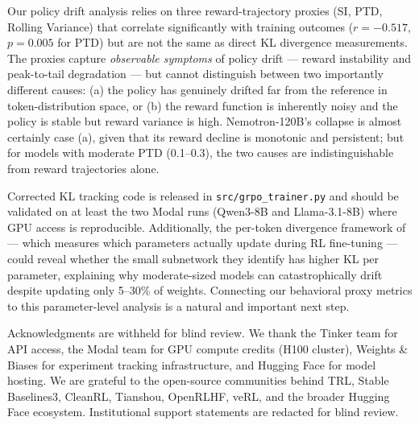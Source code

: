 \documentclass{article}
\begin{document}
Our policy drift analysis relies on three reward-trajectory proxies (SI, PTD,
Rolling Variance) that correlate significantly with training outcomes
($r = -0.517$, $p = 0.005$ for PTD) but are not the same as direct KL
divergence measurements.
The proxies capture \emph{observable symptoms} of policy drift --- reward
instability and peak-to-tail degradation --- but cannot distinguish between
two importantly different causes: (a) the policy has genuinely drifted far from
the reference in token-distribution space, or (b) the reward function is
inherently noisy and the policy is stable but reward variance is high.
Nemotron-120B's collapse is almost certainly case (a), given that its reward
decline is monotonic and persistent; but for models with moderate PTD (0.1--0.3),
the two causes are indistinguishable from reward trajectories alone.

Corrected KL tracking code is released in \texttt{src/grpo\_trainer.py} and
should be validated on at least the two Modal runs (Qwen3-8B and
Llama-3.1-8B) where GPU access is reproducible.
Additionally, the per-token divergence framework of \citet{liu2025rlsubnetworks}
--- which measures which parameters actually update during RL fine-tuning ---
could reveal whether the small subnetwork they identify has higher KL per
parameter, explaining why moderate-sized models can catastrophically drift
despite updating only 5--30\% of weights.
Connecting our behavioral proxy metrics to this parameter-level analysis is a
natural and important next step.





\begin{ack}
Acknowledgments are withheld for blind review. We thank the Tinker team for
API access, the Modal team for GPU compute credits (H100 cluster), Weights
\& Biases for experiment tracking infrastructure, and Hugging Face for model
hosting. We are grateful to the open-source communities behind TRL, Stable
Baselines3, CleanRL, Tianshou, OpenRLHF, veRL, and the broader Hugging Face
ecosystem. Institutional support statements are redacted for blind review.
\end{ack}

\end{document}
